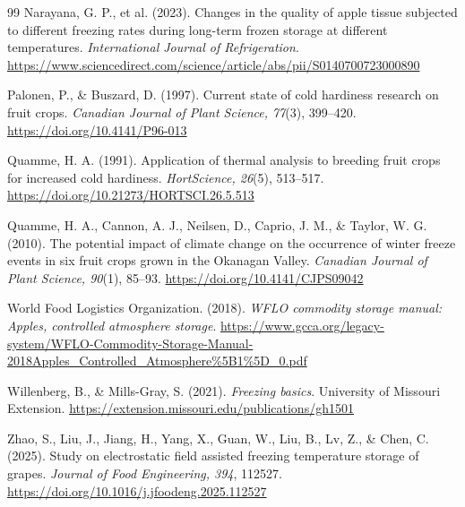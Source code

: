 \begin{thebibliography}{99}
Narayana, G. P., et al. (2023). Changes in the quality of apple tissue subjected to different freezing rates during long-term frozen storage at different temperatures. \emph{International Journal of Refrigeration}. \url{https://www.sciencedirect.com/science/article/abs/pii/S0140700723000890}

Palonen, P., \& Buszard, D. (1997). Current state of cold hardiness research on fruit crops. \emph{Canadian Journal of Plant Science, 77}(3), 399--420. \url{https://doi.org/10.4141/P96-013}

Quamme, H. A. (1991). Application of thermal analysis to breeding fruit crops for increased cold hardiness. \emph{HortScience, 26}(5), 513--517. \url{https://doi.org/10.21273/HORTSCI.26.5.513}

Quamme, H. A., Cannon, A. J., Neilsen, D., Caprio, J. M., \& Taylor, W. G. (2010). The potential impact of climate change on the occurrence of winter freeze events in six fruit crops grown in the Okanagan Valley. \emph{Canadian Journal of Plant Science, 90}(1), 85--93. \url{https://doi.org/10.4141/CJPS09042}

World Food Logistics Organization. (2018). \emph{WFLO commodity storage manual: Apples, controlled atmosphere storage}. \url{https://www.gcca.org/legacy-system/WFLO-Commodity-Storage-Manual-2018Apples_Controlled_Atmosphere%5B1%5D_0.pdf}

Willenberg, B., \& Mills-Gray, S. (2021). \emph{Freezing basics}. University of Missouri Extension. \url{https://extension.missouri.edu/publications/gh1501}

Zhao, S., Liu, J., Jiang, H., Yang, X., Guan, W., Liu, B., Lv, Z., \& Chen, C. (2025). Study on electrostatic field assisted freezing temperature storage of grapes. \emph{Journal of Food Engineering, 394}, 112527. \url{https://doi.org/10.1016/j.jfoodeng.2025.112527}

\end{thebibliography}

